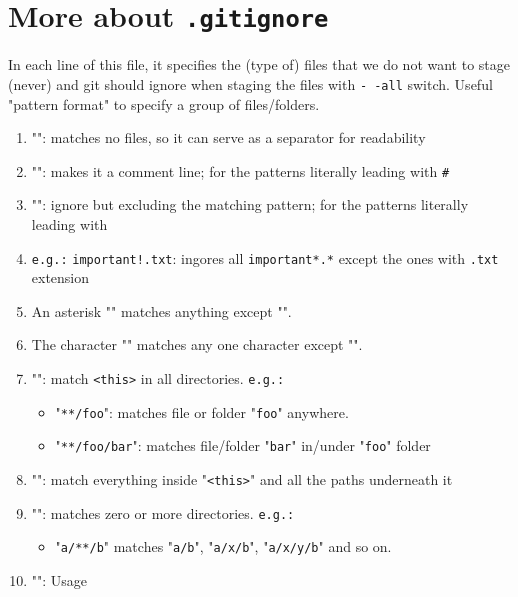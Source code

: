 \section{More about \texttt{.gitignore}}   \label{app:ignore-cmd}
 In each line of this file, it specifies the (type of) files that we do not want to stage (never) and git should ignore when staging the files with \texttt{-\,-all} switch. 
 \nl Useful "pattern format" to specify a group of files/folders.

\begin{enumerate}\packed
\item "": matches no files, so it can serve as a separator for readability
\item "\TT{\#}": makes it a comment line; \TT{\textbackslash{}\#} for the patterns literally leading with \texttt{\#}  
\item "\TT{!}": ignore but excluding the matching pattern; \TT{\textbackslash{}\!} for the patterns literally leading with \texttt{\!} 
\item[] \texttt{e.g.:} \texttt{\!important!.txt}: ingores all \texttt{\!important*.*} except the ones with \texttt{.txt} extension
\item An asterisk "\TT{*}" matches anything except "\TT{\textbackslash{}}".
\item The character "" matches any one character except "\TT{\textbackslash{}}". 
\item "": match \texttt{<this>} in all directories. \texttt{e.g.:}
\begin{itemize}\packed
\item "\texttt{**/foo}": matches file or folder "\texttt{foo}" anywhere.
\item "\texttt{**/foo/bar}": matches file/folder "\texttt{bar}" in/under "\texttt{foo}" folder
\end{itemize}
\item "": match everything inside "\texttt{<this>}" and all the paths underneath it
\item "\TT{/**/}": matches zero or more directories. \texttt{e.g.:}
\begin{itemize}\packed
\item "\texttt{a/**/b}" matches "\texttt{a/b}", "\texttt{a/x/b}", "\texttt{a/x/y/b}" and so on.
\end{itemize}
\item "\TT{*}": Usage
\begin{itemize}\packed

\end{itemize}
\end{enumerate}
